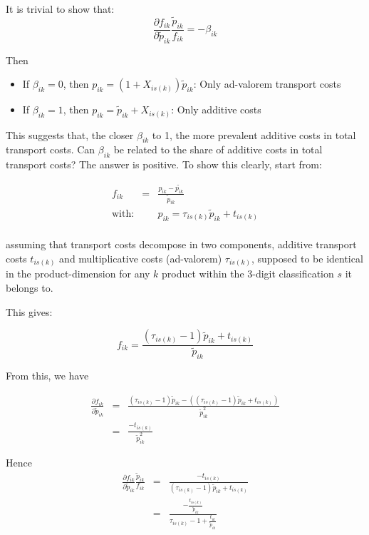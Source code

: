 \documentclass[a4paper,12pt]{article}
\begin{document}
It is trivial to show that:
$$\frac{\partial f_{ik}}{\partial \tilde{p}_{ik}} \frac{\tilde{p}_{ik}}{f_{ik}}= -\beta_{ik}$$

Then
\begin{itemize}
\item If $\beta_{ik} = 0$, then $p_{ik} = (1+X_{is(k)})\tilde{p}_{ik}$: Only ad-valorem transport costs
\item If $\beta_{ik} = 1$, then $p_{ik}=\tilde{p}_{ik}+X_{is(k)}$: Only additive costs
\end{itemize}

This suggests that, the closer $\beta_{ik}$ to 1, the more prevalent additive costs in total transport costs. Can $\beta_{ik}$ be related to the share of additive costs in total transport costs? The answer is positive. To show this clearly, start from:

\begin{eqnarray*}
f_{ik} &=& \frac{p_{ik}-\tilde{p_{ik}}}{\tilde{p}_{ik}}\\
\text{with}:&& p_{ik} = \tau_{is(k)}\tilde{p}_{ik} + t_{is(k)} \\
\end{eqnarray*}

assuming that transport costs decompose in two components, additive transport costs $t_{is(k)}$ and multiplicative costs (ad-valorem) $\tau_{is(k)}$, supposed to be identical in the product-dimension for any $k$ product within the 3-digit classification $s$ it belongs to.

This gives:

$$f_{ik} = \frac{(\tau_{is(k)}-1)\tilde{p}_{ik}+t_{is(k)}}{\tilde{p}_{ik}}$$

From this, we have

\begin{eqnarray*}
\frac{\partial f_{ik}}{\partial \tilde{p}_{ik}} &=& \frac{(\tau_{is(k)}-1)\tilde{p}_{ik} - ((\tau_{is(k)}-1)\tilde{p}_{ik} +t_{is(k)})}{\tilde{p}_{ik}^2} \\
&=& \frac{-t_{is(k)}}{\tilde{p}_{ik}^2}
\end{eqnarray*}

Hence
\begin{eqnarray*}
\frac{\partial f_{ik}}{\partial \tilde{p}_{ik}} \frac{\tilde{p}_{ik}}{f_{ik}}&=& \frac{-t_{is(k)}}{(\tau_{is(k)}-1)\tilde{p}_{ik} +t_{is(k)}}\\
&=& \frac{-\frac{t_{is(k)}}{\tilde{p}_{ik}}}{\tau_{is(k)}-1 +\frac{t_{ik}}{\tilde{p}_{ik}}}
\end{eqnarray*}
\end{document}

